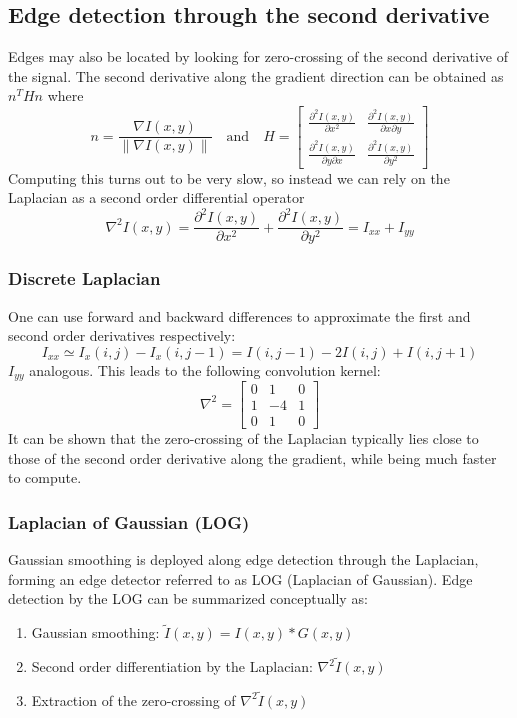 \documentclass{article}
\begin{document}
\subsection{Edge detection through the second derivative}
Edges may also be located by looking for zero-crossing of the second derivative of the signal. The second derivative along the gradient direction can be obtained as $n^THn$ where 
\[
    n = \frac{\nabla I(x,y)}{\|\nabla I(x,y)\|} \quad \text{and} \quad H = \begin{bmatrix}
        \frac{\partial^2I(x,y)}{\partial x^2} & \frac{\partial^2I(x,y)}{\partial x \partial y}\\
        \frac{\partial^2I(x,y)}{\partial y \partial x} & \frac{\partial^2I(x,y)}{\partial y^2}
    \end{bmatrix}
\]
Computing this turns out to be very slow, so instead we can rely on the Laplacian as a second order differential operator 
\[
    \nabla^2 I(x,y) = \frac{\partial^2I(x,y)}{\partial x^2}+\frac{\partial^2I(x,y)}{\partial y^2} = I_{xx}+I_{yy}
\]
\subsubsection{Discrete Laplacian}
One can use forward and backward differences to approximate the first and second order derivatives respectively:
\[
    I_{xx} \simeq I_x(i,j)-I_x(i,j-1)=I(i,j-1) - 2I(i,j)+I(i,j+1)
\]
$I_{yy}$ analogous. This leads to the following convolution kernel:
\[
    \nabla^2 = \begin{bmatrix}
        0 & 1  & 0 \\
        1 & -4  & 1 \\
        0 & 1  & 0 
    \end{bmatrix}
\]
It can be shown that the zero-crossing of the Laplacian typically lies close to those of the second order derivative along the gradient, while being much faster to compute. 
\subsubsection{Laplacian of Gaussian (LOG)}
Gaussian smoothing is deployed along edge detection through the Laplacian, forming an edge detector referred to as LOG (Laplacian of Gaussian). Edge detection by the LOG can be summarized conceptually as:
\begin{enumerate}
    \item Gaussian smoothing: $\tilde{I}(x,y) = I(x,y) \ast G(x,y)$ 
    \item Second order differentiation by the Laplacian: $\nabla^2\tilde{I}(x,y)$
    \item Extraction of the zero-crossing of $\nabla^2\tilde{I}(x,y)$ 
\end{enumerate}
\end{document}

